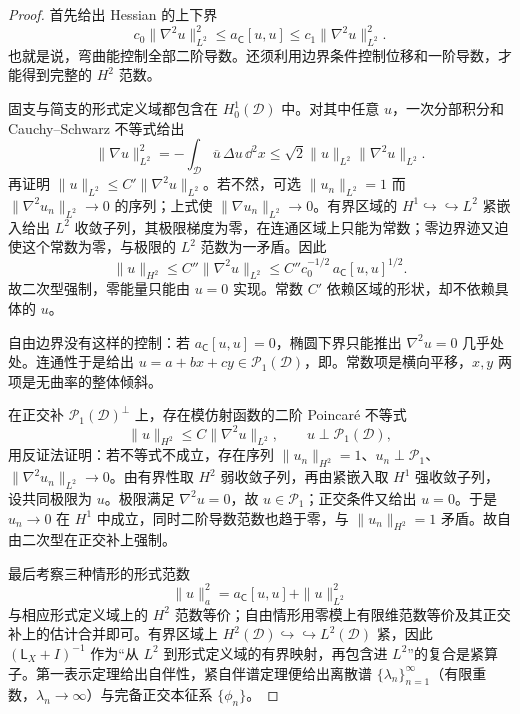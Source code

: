 \begin{proof}
 首先给出 Hessian 的上下界
\begin{equation*}
 c_0\|\nabla^2u\|_{L^2}^2
 \le a_{\mathsf C}[u,u]
 \le c_1\|\nabla^2u\|_{L^2}^2.
\end{equation*}
也就是说，弯曲能控制全部二阶导数。还须利用边界条件控制位移和一阶导数，才能得到完整的 \(H^2\) 范数。

固支与简支的形式定义域都包含在 \(H_0^1(\mathcal D)\) 中。对其中任意 \(u\)，一次分部积分和 Cauchy--Schwarz 不等式给出
\[
 \|\nabla u\|_{L^2}^2
 =-\int_\mathcal D\overline u\,\Delta u\,\dd^2x
 \le\sqrt2\|u\|_{L^2}\|\nabla^2u\|_{L^2}.
\]
再证明 \(\|u\|_{L^2}\le C'\|\nabla^2u\|_{L^2}\)。若不然，可选 \(\|u_n\|_{L^2}=1\) 而 \(\|\nabla^2u_n\|_{L^2}\to0\) 的序列；上式使 \(\|\nabla u_n\|_{L^2}\to0\)。有界区域的 \(H^1\hookrightarrow\hookrightarrow L^2\) 紧嵌入给出 \(L^2\) 收敛子列，其极限梯度为零，在连通区域上只能为常数；零边界迹又迫使这个常数为零，与极限的 \(L^2\) 范数为一矛盾。因此
\begin{equation*}
 \|u\|_{H^2}\le C''\|\nabla^2u\|_{L^2}\le C''c_0^{-1/2}\,a_{\mathsf C}[u,u]^{1/2}.
\end{equation*}
故二次型强制，零能量只能由 \(u=0\) 实现。常数 \(C'\) 依赖区域的形状，却不依赖具体的 \(u\)。

自由边界没有这样的控制：若 \(a_{\mathsf C}[u,u]=0\)，椭圆下界只能推出 \(\nabla^2u=0\) 几乎处处。连通性于是给出 \(u=a+bx+cy\in\mathcal P_1(\mathcal D)\)，即。常数项是横向平移，\(x,y\) 两项是无曲率的整体倾斜。

在正交补 \(\mathcal P_1(\mathcal D)^\perp\) 上，存在模仿射函数的二阶 Poincar\'e 不等式
\begin{equation*}
 \|u\|_{H^2}\le C\|\nabla^2u\|_{L^2},
 \qquad u\perp\mathcal P_1(\mathcal D),
\end{equation*}
用反证法证明：若不等式不成立，存在序列 \(\|u_n\|_{H^2}=1\)、\(u_n\perp\mathcal P_1\)、\(\|\nabla^2u_n\|_{L^2}\to0\)。由有界性取 \(H^2\) 弱收敛子列，再由紧嵌入取 \(H^1\) 强收敛子列，设共同极限为 \(u\)。极限满足 \(\nabla^2u=0\)，故 \(u\in\mathcal P_1\)；正交条件又给出 \(u=0\)。于是 \(u_n\to0\) 在 \(H^1\) 中成立，同时二阶导数范数也趋于零，与 \(\|u_n\|_{H^2}=1\) 矛盾。故自由二次型在正交补上强制。

最后考察三种情形的形式范数
\begin{equation*}
 \|u\|_a^2=a_{\mathsf C}[u,u]+\|u\|_{L^2}^2
\end{equation*}
与相应形式定义域上的 \(H^2\) 范数等价；自由情形用零模上有限维范数等价及其正交补上的估计合并即可。有界区域上 \(H^2(\mathcal D)\hookrightarrow\hookrightarrow L^2(\mathcal D)\) 紧，因此 \((\mathsf L_X+I)^{-1}\) 作为“从 \(L^2\) 到形式定义域的有界映射，再包含进 \(L^2\)”的复合是紧算子。第一表示定理给出自伴性，紧自伴谱定理便给出离散谱 \(\{\lambda_n\}_{n=1}^\infty\)（有限重数，\(\lambda_n\to\infty\)）与完备正交本征系 \(\{\phi_n\}\)。

\end{proof}

